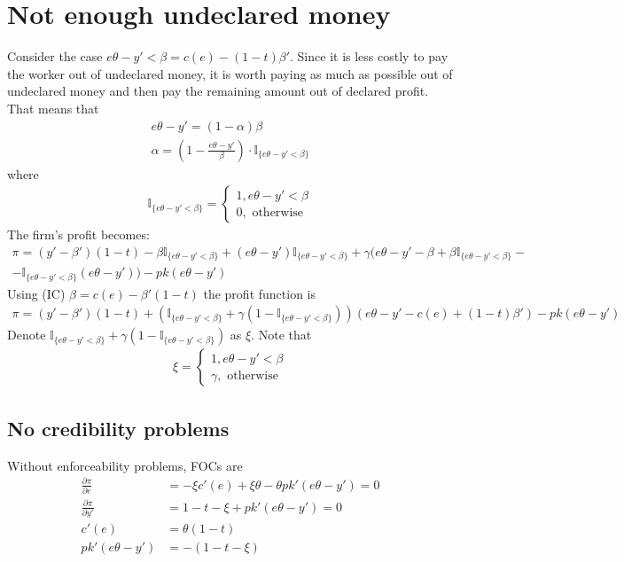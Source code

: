 \documentclass[a4paper]{article}
\begin{document}
\section{Not enough undeclared money}
Consider the case $e\theta - y' < \beta = c(e) - (1-t)\beta'$. Since it is less costly to pay the worker out of undeclared money, it is worth paying as much as possible out of undeclared money and then pay the remaining amount out of declared profit. That means that 
\begin{align*}
e\theta - y' = (1 - \alpha) \beta\\
\alpha = \left(1 - \frac{e \theta - y'}{\beta}\right)\cdot\mathbb{I}_{\{e \theta - y' < \beta\}}
\end{align*}
where
\begin{align*}
\mathbb{I}_{\{e \theta - y' < \beta\}} = \begin{cases}
1, e\theta - y' < \beta\\
0, \text{ otherwise}
\end{cases}
\end{align*}
The firm's profit becomes:
\begin{align*}
\pi = (y' - \beta')(1 - t) - \beta\mathbb{I}_{\{e \theta - y' < \beta\}} + (e \theta - y')\mathbb{I}_{\{e \theta - y' < \beta\}} + \gamma(e\theta - y' - \beta + \beta \mathbb{I}_{\{e \theta -y' < \beta\}} -\\ -\mathbb{I}_{\{e \theta - y' < \beta\}}(e\theta - y')) - pk(e \theta - y')
\end{align*}
Using (IC) $\beta = c(e) - \beta'(1-t)$ the profit function is
\begin{align*}
\pi = (y'-\beta')(1-t) +(\mathbb{I}_{\{e \theta - y' < \beta\}} + \gamma(1-\mathbb{I}_{\{e \theta - y' < \beta\}}))(e \theta -y' - c(e) + (1-t)\beta')-pk(e \theta - y')
\end{align*}
Denote $\mathbb{I}_{\{e \theta - y' < \beta\}} + \gamma(1-\mathbb{I}_{\{e \theta - y' < \beta\}})$ as $\xi$. Note that
\begin{align*}
\xi = \begin{cases}
1, e\theta - y' < \beta\\
\gamma, \text{ otherwise}
\end{cases}
\end{align*}
\subsection{No credibility problems}
Without enforceability problems, FOCs are
\begin{align*}
\frac{\partial \pi }{\partial e} &= -\xi c'(e) + \xi \theta - \theta p k'(e\theta - y') = 0\\
\frac{\partial \pi}{\partial y'} &= 1-t - \xi + pk'(e \theta - y') = 0\\
c'(e) &= \theta(1-t)\\
pk'(e \theta -y') &= -(1 - t - \xi)
\end{align*}
\end{document}
